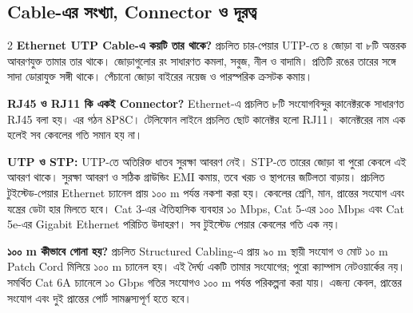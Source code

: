\subsection{Cable-এর সংখ্যা, Connector ও দূরত্ব}
\label{ch2:wired-numeric}
\begin{multicols}{2}
\textbf{Ethernet UTP Cable-এ কয়টি তার থাকে?} প্রচলিত চার-পেয়ার UTP-তে ৪ জোড়া বা ৮টি অন্তরক আবরণযুক্ত তামার তার থাকে। জোড়াগুলোর রং সাধারণত কমলা, সবুজ, নীল ও বাদামি। প্রতিটি রঙের তারের সঙ্গে সাদা ডোরাযুক্ত সঙ্গী থাকে। পেঁচানো জোড়া বাইরের নয়েজ ও পারস্পরিক ক্রসটক কমায়।\par
\textbf{RJ45 ও RJ11 কি একই Connector?} Ethernet-এ প্রচলিত ৮টি সংযোগবিন্দুর কানেক্টরকে সাধারণত RJ45 বলা হয়। এর গঠন 8P8C। টেলিফোন লাইনে প্রচলিত ছোট কানেক্টর হলো RJ11। কানেক্টরের নাম এক হলেই সব কেবলের গতি সমান হয় না।\par
\end{multicols}
\textbf{UTP ও STP:} UTP-তে অতিরিক্ত ধাতব সুরক্ষা আবরণ নেই। STP-তে তারের জোড়া বা পুরো কেবলে এই আবরণ থাকে। সুরক্ষা আবরণ ও সঠিক গ্রাউন্ডিং EMI কমায়, তবে খরচ ও স্থাপনের জটিলতা বাড়ায়। প্রচলিত টুইস্টেড-পেয়ার Ethernet চ্যানেল প্রায় ১০০ m পর্যন্ত নকশা করা হয়। কেবলের শ্রেণি, মান, প্রান্তের সংযোগ এবং যন্ত্রের ডেটা হার মিলতে হবে। Cat 3-এর ঐতিহাসিক ব্যবহার ১০ Mbps, Cat 5-এর ১০০ Mbps এবং Cat 5e-এর Gigabit Ethernet পরিচিত উদাহরণ। সব টুইস্টেড পেয়ার কেবলের গতি এক নয়।

\textbf{১০০ m কীভাবে গোনা হয়?} প্রচলিত Structured Cabling-এ প্রায় ৯০ m স্থায়ী সংযোগ ও মোট ১০ m Patch Cord মিলিয়ে ১০০ m চ্যানেল হয়। এই দৈর্ঘ্য একটি তামার সংযোগের; পুরো ক্যাম্পাস নেটওয়ার্কের নয়। সমর্থিত Cat 6A চ্যানেলে ১০ Gbps গতির সংযোগও ১০০ m পর্যন্ত পরিকল্পনা করা যায়। এজন্য কেবল, প্রান্তের সংযোগ এবং দুই প্রান্তের পোর্ট সামঞ্জস্যপূর্ণ হতে হবে।

